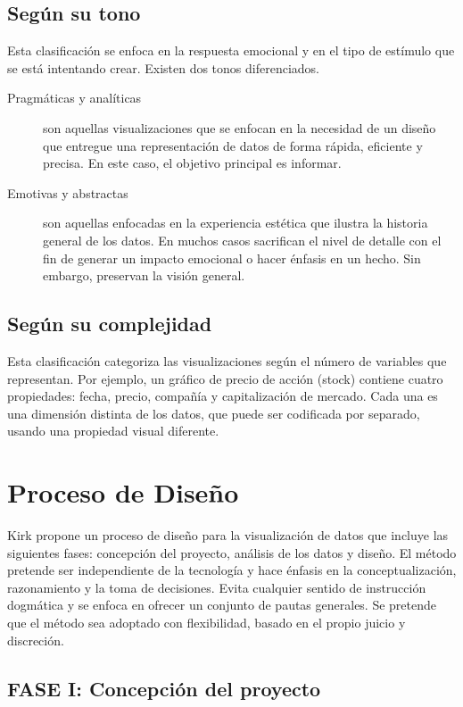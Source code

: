 \subsection{Según su tono}

Esta clasificación se enfoca en la respuesta emocional y en el tipo de estímulo que se está intentando crear. Existen dos tonos diferenciados.

\begin{description}
\item[Pragmáticas y analíticas] son aquellas visualizaciones que se enfocan en la necesidad de un diseño que entregue una representación de datos de forma rápida, eficiente y precisa. En este caso, el objetivo principal es informar.
\item[Emotivas y abstractas] son aquellas enfocadas en la experiencia estética que ilustra la historia general de los datos. En muchos casos sacrifican el nivel de detalle con el fin de generar un impacto emocional o hacer énfasis en un hecho. Sin embargo, preservan la visión general.
\end{description}

\subsection{Según su complejidad}

Esta clasificación categoriza las visualizaciones según el número de variables que representan. Por ejemplo, un gráfico de precio de acción (stock) contiene cuatro propiedades: fecha, precio, compañía y capitalización de mercado. Cada una es una dimensión distinta de los datos, que puede ser codificada por separado, usando una propiedad visual diferente.

\section{Proceso de Diseño}

Kirk \cite{Kir12} propone un proceso de diseño para la visualización de datos que incluye las siguientes fases: concepción del proyecto, análisis de los datos y diseño. El método pretende ser independiente de la tecnología y hace énfasis en la conceptualización, razonamiento y la toma de decisiones. Evita cualquier sentido de instrucción dogmática y se enfoca en ofrecer un conjunto de pautas generales. Se pretende que el método sea adoptado con flexibilidad, basado en el propio juicio y discreción.

\subsection{FASE I: Concepción del proyecto}

